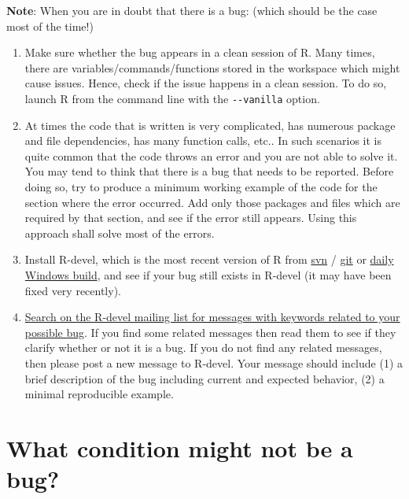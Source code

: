 \documentclass[
]{book}
\begin{document}
\textbf{Note}:
When you are in doubt that there is a bug: (which should be the case most of the time!)

\begin{enumerate}
\def\labelenumi{\arabic{enumi}.}
\item
  Make sure whether the bug appears in a clean session of R. Many times, there are variables/commands/functions stored in the workspace which might cause issues. Hence, check if the issue happens in a clean session. To do so, launch R from the command line with the \texttt{-\/-vanilla} option.
\item
  At times the code that is written is very complicated, has numerous package and file dependencies, has many function calls, etc.. In such scenarios it is quite common that the code throws an error and you are not able to solve it. You may tend to think that there is a bug that needs to be reported. Before doing so, try to produce a minimum working example of the code for the section where the error occurred. Add only those packages and files which are required by that section, and see if the error still appears. Using this approach shall solve most of the errors.
\item
  Install R-devel, which is the most recent version of R from \href{https://svn.r-project.org/R/trunk/}{svn} / \href{https://github.com/r-devel/r-svn}{git} or \href{https://cran.r-project.org/bin/windows/base/rdevel.html}{daily Windows build}, and see if your bug still exists in R-devel (it may have been fixed very recently).
\item
  \href{https://r.789695.n4.nabble.com/template/NamlServlet.jtp?macro=search_page\&node=909078\&query=isna\&days=0}{Search on the R-devel mailing list for messages with keywords related to your possible bug}. If you find some related messages then read them to see if they clarify whether or not it is a bug. If you do not find any related messages, then please post a new message to R-devel. Your message should include (1) a brief description of the bug including current and expected behavior, (2) a minimal reproducible example.
\end{enumerate}

\hypertarget{what-condition-might-not-be-a-bug}{%
\section{What condition might not be a bug?}\label{what-condition-might-not-be-a-bug}}
\end{document}
